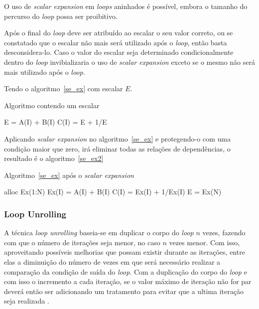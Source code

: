 O uso de \textit{scalar expansion} em \textit{loops} aninhados é possível,
embora o tamanho do percurso do \textit{loop} possa ser proibitivo.

Após o final do \textit{loop} deve ser atribuído ao escalar o seu valor correto,
ou se constatado que o escalar não mais será utilizado após o \textit{loop},
então basta desconsidera-lo.
Caso o valor do escalar seja determinado condicionalmente dentro do
\textit{loop} invibializaria o uso de \textit{scalar expansion} exceto se o
mesmo não será mais utilizado após o \textit{loop}.

Tendo o algoritmo~\ref{se_ex} com escalar $E$.


\begin{algorithm}
\caption{Algoritmo contendo um escalar}
\label{se_ex}
\begin{algorithmic}[1]

\STATE E = A(I) + B(I)
\STATE C(I) = E + 1/E
\ENDFOR

\end{algorithmic}
\end{algorithm}

Aplicando \textit{scalar expansion} no algoritmo~\ref{se_ex} e protegendo-o com
uma condição maior que zero, irá eliminar todas as relações de dependências, o
resultado é o algoritmo~\ref{se_ex2}

\begin{algorithm}
\caption{Algoritmo~\ref{se_ex} após o \textit{scalar expansion}}
\label{se_ex2}
\begin{algorithmic}[1]

\STATE alloc Ex(1:N)
\STATE Ex(I) = A(I) + B(I)
\STATE C(I) = Ex(I) + 1/Ex(I)
\ENDFOR
\STATE E = Ex(N)
\ENDIF

\end{algorithmic}
\end{algorithm}




\subsubsection{Loop Unrolling} 

A técnica \textit{loop unrolling} baseia-se em duplicar o corpo do \textit{loop} 
$n$ vezes, fazendo com que o número de iterações seja menor, no caso $n$ vezes
menor.
Com isso, aproveitando possíveis melhorias que possam existir durante as
iterações, entre elas a diminuição do número de vezes em que será necessário
realizar a comparação da condição de saída do \textit{loop}.
Com a duplicação do corpo do \textit{loop} e com isso o incremento a cada
iteração, se o valor máximo de iteração não for par deverá então ser adicionando
um tratamento para evitar que a ultima iteração seja realizada
\cite{Dragomir:2009}.

